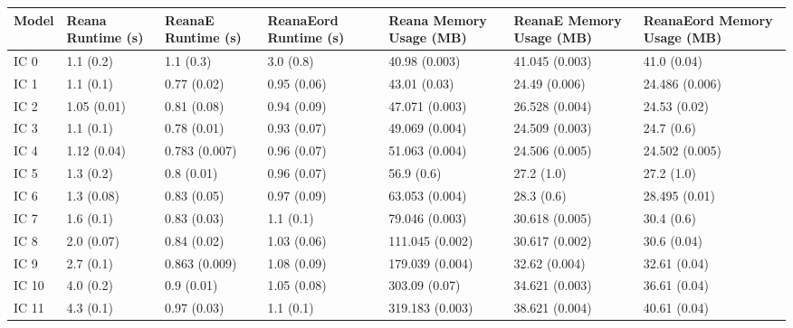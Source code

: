 \begin{tabular}{lllllll}
\toprule
Model & Reana Runtime (s) & ReanaE Runtime (s) & ReanaEord Runtime (s) & Reana Memory Usage (MB) & ReanaE Memory Usage (MB) & ReanaEord Memory Usage (MB) \\
\midrule
 IC 0 &         1.1 (0.2) &          1.1 (0.3) &             3.0 (0.8) &           40.98 (0.003) &           41.045 (0.003) &                 41.0 (0.04) \\
 IC 1 &         1.1 (0.1) &        0.77 (0.02) &           0.95 (0.06) &            43.01 (0.03) &            24.49 (0.006) &              24.486 (0.006) \\
 IC 2 &       1.05 (0.01) &        0.81 (0.08) &           0.94 (0.09) &          47.071 (0.003) &           26.528 (0.004) &                24.53 (0.02) \\
 IC 3 &         1.1 (0.1) &        0.78 (0.01) &           0.93 (0.07) &          49.069 (0.004) &           24.509 (0.003) &                  24.7 (0.6) \\
 IC 4 &       1.12 (0.04) &      0.783 (0.007) &           0.96 (0.07) &          51.063 (0.004) &           24.506 (0.005) &              24.502 (0.005) \\
 IC 5 &         1.3 (0.2) &         0.8 (0.01) &           0.96 (0.07) &              56.9 (0.6) &               27.2 (1.0) &                  27.2 (1.0) \\
 IC 6 &        1.3 (0.08) &        0.83 (0.05) &           0.97 (0.09) &          63.053 (0.004) &               28.3 (0.6) &               28.495 (0.01) \\
 IC 7 &         1.6 (0.1) &        0.83 (0.03) &             1.1 (0.1) &          79.046 (0.003) &           30.618 (0.005) &                  30.4 (0.6) \\
 IC 8 &        2.0 (0.07) &        0.84 (0.02) &           1.03 (0.06) &         111.045 (0.002) &           30.617 (0.002) &                 30.6 (0.04) \\
 IC 9 &         2.7 (0.1) &      0.863 (0.009) &           1.08 (0.09) &         179.039 (0.004) &            32.62 (0.004) &                32.61 (0.04) \\
IC 10 &         4.0 (0.2) &         0.9 (0.01) &           1.05 (0.08) &           303.09 (0.07) &           34.621 (0.003) &                36.61 (0.04) \\
IC 11 &         4.3 (0.1) &        0.97 (0.03) &             1.1 (0.1) &         319.183 (0.003) &           38.621 (0.004) &                40.61 (0.04) \\

\end{tabular}
